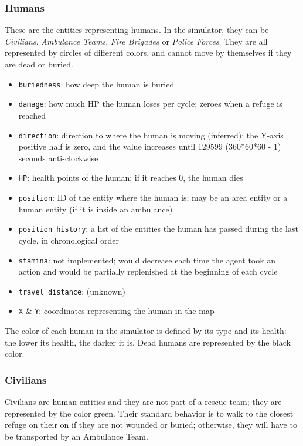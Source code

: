 \documentclass{article}
\begin{document}
\subsubsection{Humans}
These are the entities representing humans. In the simulator, they can be \emph{Civilians}, \emph{Ambulance Teams}, \emph{Fire Brigades} or \emph{Police Forces}. They are all represented by circles of different colors, and cannot move by themselves if they are dead or buried.
\begin{itemize}
  \item \texttt{buriedness}: how deep the human is buried
  \item \texttt{damage}: how much HP the human loses per cycle; zeroes when a refuge is reached
  \item \texttt{direction}: direction to where the human is moving (inferred); the Y-axis positive half is zero, and the value increases until   129599 (360*60*60 - 1) seconds anti-clockwise
  \item \texttt{HP}: health points of the human; if it reaches 0, the human dies
  \item \texttt{position}: ID of the entity where the human is; may be an area entity or a human entity (if it is inside an ambulance)
  \item \texttt{position history}: a list of the entities the human has passed during the last cycle, in chronological order
  \item \texttt{stamina}: not implemented; would decrease each time the agent took an action and would be partially replenished at the beginning of each cycle
  \item \texttt{travel distance}: (unknown)
  \item \texttt{X} \& \texttt{Y}: coordinates representing the human in the map
\end{itemize}

The color of each human in the simulator is defined by its type and its health: the lower its health, the darker it is. Dead humans are represented by the black color.
\subsubsection{Civilians}

Civilians are human entities and they are not part of a rescue team; they are represented by the color green. Their standard behavior is to walk to the closest refuge on their on if they are not wounded or buried; otherwise, they will have to be transported by an Ambulance Team.
\end{document}
